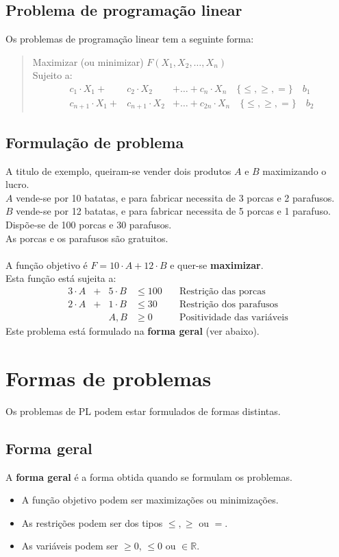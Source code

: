 \documentclass[]{report}
\begin{document}
\subsection{Problema de programação linear}
Os problemas de programação linear tem a seguinte forma:
\begin{quotation}
\noindent
Maximizar (ou minimizar) $F(X_1, X_2, \dots, X_n)$\\
Sujeito a:
$$\begin{array}{rrl}
c_1 \cdot X_1  + & c_2 \cdot X_2 & + \dots + c_n \cdot X_n \quad \{\leq, \geq, =\}\quad b_1\\
c_{n+1} \cdot X_1 + & c_{n+1} \cdot X_2 & + \dots + c_{2n} \cdot X_n \quad \{\leq, \geq, =\}\quad b_2
\end{array}
$$
\end{quotation}
\subsection{Formulação de problema}
A titulo de exemplo, queiram-se vender dois produtos $A$ e $B$ maximizando o lucro.\\
$A$ vende-se por 10 batatas, e para fabricar necessita de 3 porcas e 2 parafusos.\\
$B$ vende-se por 12 batatas, e para fabricar necessita de 5 porcas e 1 parafuso.\\ 
Dispõe-se de 100 porcas e 30 parafusos.\\
As porcas e os parafusos são gratuitos.\\ \\
A função objetivo é $F = 10 \cdot A + 12 \cdot B$ e quer-se \textbf{maximizar}.\\
Esta função está sujeita a:
$$\begin{array}{rccll}
3 \cdot A &+& 5 \cdot B &\leq 100 \quad &\text{Restrição das porcas}\\
2 \cdot A &+& 1 \cdot B &\leq 30 \quad &\text{Restrição dos parafusos}\\
&&A, B& \geq 0& \text{Positividade das variáveis}
\end{array}
$$
Este problema está formulado na \textbf{forma geral} (ver abaixo).
\section{Formas de problemas}
Os problemas de PL podem estar formulados de formas distintas.
\subsection{Forma geral}
A \textbf{forma geral} é a forma obtida quando se formulam os problemas.
\begin{itemize}
\item A função objetivo podem ser maximizações ou minimizações.
\item As restrições podem ser dos tipos $\leq, \geq$ ou $=$.
\item As variáveis podem ser $\geq 0$, $\leq 0$ ou $\in \mathbb{R}$.
\end{itemize}
\end{document}
